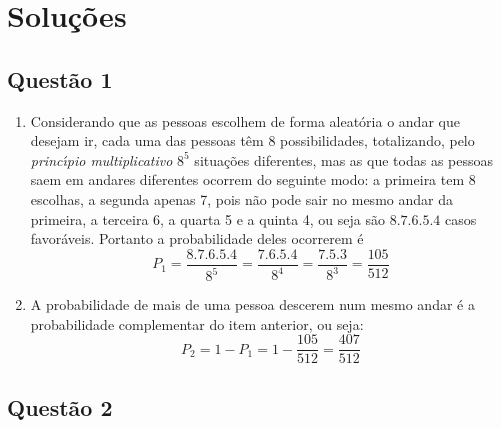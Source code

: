\section{\color{red} Solu\c c\~oes}

\subsection{\color{red} Quest\~ao 1}

\begin{enumerate}

\item[(a)] Considerando que as pessoas escolhem de forma aleat\'oria o andar que desejam ir, cada uma das pessoas t\^em 8 possibilidades, totalizando, pelo {\it princ\'\i pio multiplicativo} $8^5$ situa\c c\~oes diferentes, mas as que todas as pessoas saem em andares diferentes ocorrem do seguinte modo: a primeira tem 8 escolhas, a segunda apenas 7, pois n\~ao pode sair no mesmo andar da primeira, a terceira 6, a quarta 5 e a quinta 4, ou seja s\~ao $8.7.6.5.4$ casos favor\'aveis. Portanto a probabilidade deles ocorrerem \'e $$P_1= \frac{8.7.6.5.4}{8^5}=\frac{7.6.5.4}{8^4}=\frac{7.5.3}{8^3}=\frac{105}{512}$$

\item[(b)] A probabilidade de mais de uma pessoa descerem num mesmo andar \'e a probabilidade complementar do item anterior, ou seja: $$P_2=1-P_1=1-\frac{105}{512}=\frac{407}{512}$$

\end{enumerate}

\subsection{\color{red} Quest\~ao 2}

